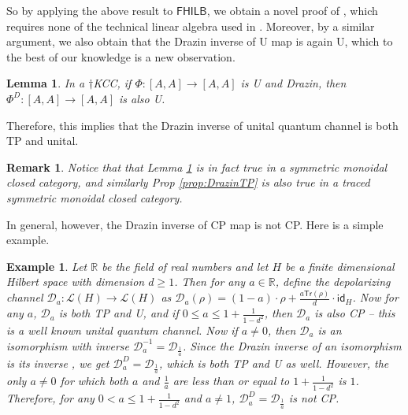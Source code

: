 \documentclass[submission,copyright,creativecommons]{eptcs}
\newtheorem{lemma}[observation]{Lemma}  %
\newtheorem{example}[observation]{Example}
\newtheorem{remark}[observation]{Remark}
\begin{document}
So by applying the above result to $\mathsf{FHILB}$, we obtain a novel proof of \cite[Thm 2]{cao2021nisq}, which requires none of the technical linear algebra used in \cite[App A]{cao2021nisq}. Moreover, by a similar argument, we also obtain that the Drazin inverse of U map is again U, which to the best of our knowledge is a new observation. 

\begin{lemma}\label{lemma:DrazinU} In a $\dagger$KCC, if $\Phi: {[A,A]} \to [A,A]$ is U and Drazin, then $\Phi^D: {[A,A]} \to {[A,A]}$ is also U.
\end{lemma}

Therefore, this implies that the Drazin inverse of unital quantum channel is both TP and unital. 

\begin{remark} Notice that that Lemma \ref{lemma:DrazinU} is in fact true in a symmetric monoidal closed category, and similarly Prop \ref{prop:DrazinTP} is also true in a traced symmetric monoidal closed category. 
\end{remark}

In general, however, the Drazin inverse of CP map is not CP. Here is a simple example. 

\begin{example}\label{ex:depolar} Let $\mathbb{R}$ be the field of real numbers and let $H$ be a finite dimensional Hilbert space with dimension $d \geq 1$. Then for any $a \in \mathbb{R}$, define the depolarizing channel $\mathcal{D}_a: \mathcal{L}(H) \to \mathcal{L}(H)$ as $\mathcal{D}_a(\rho) = (1-a)\cdot\rho + \frac{a \mathsf{Tr}(\rho)}{d} \cdot \mathsf{id}_H$. Now for any $a$, $\mathcal{D}_a$ is both TP and U, and if $0 \leq a \leq 1+ \frac{1}{1-d^2}$, then $\mathcal{D}_a$ is also CP -- this is a well known unital quantum channel. Now if $a \neq 0$, then $\mathcal{D}_a$ is an isomorphism with inverse $\mathcal{D}_a^{-1} = \mathcal{D}_{\frac{1}{a}}$. Since the Drazin inverse of an isomorphism is its inverse \cite[Lem 3.6]{cockett2024drazin}, we get $\mathcal{D}^D_a = \mathcal{D}_{\frac{1}{a}}$, which is both TP and U as well. However, the only $a \neq 0$ for which both $a$ and $\frac{1}{a}$ are less than or equal to $1+ \frac{1}{1-d^2}$ is $1$. Therefore, for any $0 < a \leq 1+ \frac{1}{1-d^2}$ and $a \neq 1$, $\mathcal{D}^D_a = \mathcal{D}_{\frac{1}{a}}$ is not CP. 
\end{example}
\end{document}

